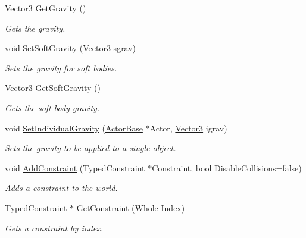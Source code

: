 \begin{DoxyCompactItemize}
\hyperlink{classphys_1_1Vector3}{Vector3} \hyperlink{classphys_1_1PhysicsManager_a880950ca6093afd3267dcadf30934574}{GetGravity} ()
\begin{DoxyCompactList}\small\item\em Gets the gravity. \item\end{DoxyCompactList}\item 
void \hyperlink{classphys_1_1PhysicsManager_acd1fe36f7cd593da0c466002304065eb}{SetSoftGravity} (\hyperlink{classphys_1_1Vector3}{Vector3} sgrav)
\begin{DoxyCompactList}\small\item\em Sets the gravity for soft bodies. \item\end{DoxyCompactList}\item 
\hyperlink{classphys_1_1Vector3}{Vector3} \hyperlink{classphys_1_1PhysicsManager_acdaad0849c3d6386e8cff5c98fc46664}{GetSoftGravity} ()
\begin{DoxyCompactList}\small\item\em Gets the soft body gravity. \item\end{DoxyCompactList}\item 
void \hyperlink{classphys_1_1PhysicsManager_af6acab3a35e52b1e25f1ab47f494d90d}{SetIndividualGravity} (\hyperlink{classphys_1_1ActorBase}{ActorBase} $\ast$Actor, \hyperlink{classphys_1_1Vector3}{Vector3} igrav)
\begin{DoxyCompactList}\small\item\em Sets the gravity to be applied to a single object. \item\end{DoxyCompactList}\item 
void \hyperlink{classphys_1_1PhysicsManager_aa2e58b40c1031c777d828b2409befbb9}{AddConstraint} (TypedConstraint $\ast$Constraint, bool DisableCollisions=false)
\begin{DoxyCompactList}\small\item\em Adds a constraint to the world. \item\end{DoxyCompactList}\item 
TypedConstraint $\ast$ \hyperlink{classphys_1_1PhysicsManager_af3a7b3a98c885785875375cae608b4d5}{GetConstraint} (\hyperlink{namespacephys_a460f6bc24c8dd347b05e0366ae34f34a}{Whole} Index)
\begin{DoxyCompactList}\small\item\em Gets a constraint by index. \item\end{DoxyCompactList}\item 

\end{DoxyCompactItemize}
